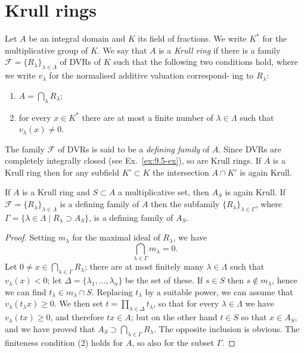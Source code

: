 \section{Krull rings}\label{sec:12}

Let $A$ be an integral domain and $K$ its field of fractions. We write
$K^*$ for the multiplicative group of $K$. We say that $A$ is a \emph{Krull ring} if there is
a family $\mathcal{F} = \{R_\lambda\}_{\lambda \in \Lambda}$ of DVRs of $K$ such that the following two conditions
hold, where we write $v_\lambda$ for the normalised additive valuation correspond-
ing to $R_\lambda$:
\begin{enumerate}[(1)]
  \item $A = \bigcap_\lambda R_\lambda$;
  \item for every $x \in K^*$ there are at most a finite number of $\lambda \in \Lambda$ such that
        $v_\lambda(x) \neq 0$.
\end{enumerate}
The family $\mathcal{F}$ of DVRs is said to be a \emph{defining family} of $A$. Since DVRs are
completely integrally closed (see Ex.~\ref{ex:9.5-ex}), so are Krull rings. If $A$ is a Krull
ring then for any subfield $K' \subset K$ the intersection $A \cap K'$ is again Krull.

\begin{theorem}\label{thm:12.1}
If $A$ is a Krull ring and $S \subset A$ a multiplicative set, then $A_S$ is
again Krull. If $\mathcal{F} = \{R_\lambda\}_{\lambda \in \Lambda}$ is a defining family of $A$ then the subfamily
$\{R_\lambda\}_{\lambda \in \Gamma}$, where $\Gamma = \{\lambda \in \Lambda \mid R_\lambda \supset A_S\}$, is a defining family of $A_S$.
\end{theorem}

\begin{proof}
Setting $m_\lambda$ for the maximal ideal of $R_\lambda$, we have
\[
  \bigcap_{\lambda \in \Gamma} m_\lambda = 0.
\]
Let $0 \neq x \in \bigcap_{\lambda \in \Gamma} R_\lambda$; there are at most finitely many $\lambda \in \Lambda$ such that $v_\lambda(x) < 0$;
let $\Delta = \{\lambda_1, \ldots, \lambda_n\}$ be the set of these. If $s \in S$ then $s \notin m_\lambda$, hence we can find
$t_\lambda \in m_\lambda \cap S$. Replacing $t_\lambda$ by a suitable power, we can assume that $v_\lambda(t_\lambda x) \ge 0$.
We then set $t = \prod_{\lambda \in \Delta} t_\lambda$, so that for every $\lambda \in \Lambda$ we have $v_\lambda(tx) \ge 0$, and
therefore $tx \in A$; but on the other hand $t \in S$ so that $x \in A_S$, and we have
proved that $A_S \supset \bigcap_{\lambda \in \Gamma} R_\lambda$. The opposite inclusion is obvious. The finiteness
condition (2) holds for $A$, so also for the subset $\Gamma$.
\end{proof}

